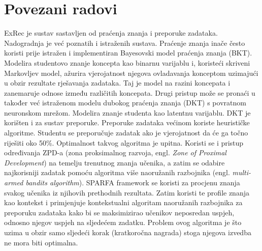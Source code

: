 \section{Povezani radovi} %
ExRec je sustav sastavljen od praćenja znanja i preporuke zadataka. Nadogradnja je već poznatih i istraženih sustava. Praćenje znanja inače često koristi prije istražen i implementiran Bayesovski model praćenja znanja (BKT). Modelira studentovo znanje koncepta kao binarnu varijablu i, koristeći skriveni Markovljev model, ažurira vjerojatnost njegova ovladavanja konceptom uzimajući u obzir rezultate rješavanja zadataka. Taj je model na razini koncepata i zanemaruje odnose između različitih koncepata.\newline
Drugi pristup može se pronaći u također već istraženom modelu dubokog praćenja znanja (DKT) s povratnom neuronskom mrežom. Modelira znanje studenta kao latentnu varijablu. DKT je korišten i za sustav preporuke.\newline
\newline
Preporuke zadataka većinom koriste heurističke algoritme. Studentu se preporučuje zadatak ako je vjerojatnost da će ga točno riješiti oko 50\%. Optimalnost takvog algoritma je upitna.\newline
Koristi se i pristup određivanja ZPD-a (zona proksimalnog razvoja, engl. \textit{Zone of Proximal Development}) na temelju trenutnog znanja učenika, a zatim se odabire najkorisniji zadatak pomoću algoritma više naoružanih razbojnika (engl.\textit{ multi-armed bandits algorithm}).\newline
SPARFA framework se koristi za procjenu znanja svakog učenika iz njihovih prethodnih rezultata. Zatim koristi te profile znanja kao kontekst i primjenjuje kontekstualni algoritam naoružanih razbojnika za preporuku zadataka kako bi se maksimizirao učenikov neposredan uspjeh, odnosno njegov uspjeh na sljedećem zadatku. Problem ovog algoritma je što uzima u obzir samo sljedeći korak (kratkoročna nagrada) stoga njegova izvedba ne mora biti optimalna.\newline
\newline
